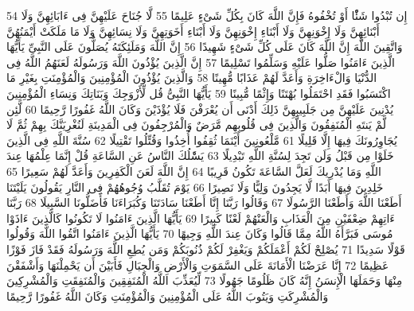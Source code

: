 \documentclass[20pt,a4paper]{article}
\begin{document}
{\tiny\colorbox{cl_aya}{54}} إِن تُبْدُوا شَئًْا أَوْ تُخْفُوهُ فَإِنَّ اللَّهَ كَانَ بِكُلِّ شَىْءٍ عَلِيمًا
{\tiny\colorbox{cl_aya}{55}} لَّا جُنَاحَ عَلَيْهِنَّ فِى ءَابَائِهِنَّ وَلَا أَبْنَائِهِنَّ وَلَا إِخْوَنِهِنَّ وَلَا أَبْنَاءِ إِخْوَنِهِنَّ وَلَا أَبْنَاءِ أَخَوَتِهِنَّ وَلَا نِسَائِهِنَّ وَلَا مَا مَلَكَتْ أَيْمَنُهُنَّ وَاتَّقِينَ اللَّهَ إِنَّ اللَّهَ كَانَ عَلَى كُلِّ شَىْءٍ شَهِيدًا
{\tiny\colorbox{cl_aya}{56}} إِنَّ اللَّهَ وَمَلَئِكَتَهُ يُصَلُّونَ عَلَى النَّبِىِّ يَأَيُّهَا الَّذِينَ ءَامَنُوا صَلُّوا عَلَيْهِ وَسَلِّمُوا تَسْلِيمًا
{\tiny\colorbox{cl_aya}{57}} إِنَّ الَّذِينَ يُؤْذُونَ اللَّهَ وَرَسُولَهُ لَعَنَهُمُ اللَّهُ فِى الدُّنْيَا وَالْءَاخِرَةِ وَأَعَدَّ لَهُمْ عَذَابًا مُّهِينًا
{\tiny\colorbox{cl_aya}{58}} وَالَّذِينَ يُؤْذُونَ الْمُؤْمِنِينَ وَالْمُؤْمِنَتِ بِغَيْرِ مَا اكْتَسَبُوا فَقَدِ احْتَمَلُوا بُهْتَنًا وَإِثْمًا مُّبِينًا
{\tiny\colorbox{cl_aya}{59}} يَأَيُّهَا النَّبِىُّ قُل لِّأَزْوَجِكَ وَبَنَاتِكَ وَنِسَاءِ الْمُؤْمِنِينَ يُدْنِينَ عَلَيْهِنَّ مِن جَلَبِيبِهِنَّ ذَلِكَ أَدْنَى أَن يُعْرَفْنَ فَلَا يُؤْذَيْنَ وَكَانَ اللَّهُ غَفُورًا رَّحِيمًا
{\tiny\colorbox{cl_aya}{60}} لَّئِن لَّمْ يَنتَهِ الْمُنَفِقُونَ وَالَّذِينَ فِى قُلُوبِهِم مَّرَضٌ وَالْمُرْجِفُونَ فِى الْمَدِينَةِ لَنُغْرِيَنَّكَ بِهِمْ ثُمَّ لَا يُجَاوِرُونَكَ فِيهَا إِلَّا قَلِيلًا
{\tiny\colorbox{cl_aya}{61}} مَّلْعُونِينَ أَيْنَمَا ثُقِفُوا أُخِذُوا وَقُتِّلُوا تَقْتِيلًا
{\tiny\colorbox{cl_aya}{62}} سُنَّةَ اللَّهِ فِى الَّذِينَ خَلَوْا مِن قَبْلُ وَلَن تَجِدَ لِسُنَّةِ اللَّهِ تَبْدِيلًا
{\tiny\colorbox{cl_aya}{63}} يَسَْٔلُكَ النَّاسُ عَنِ السَّاعَةِ قُلْ إِنَّمَا عِلْمُهَا عِندَ اللَّهِ وَمَا يُدْرِيكَ لَعَلَّ السَّاعَةَ تَكُونُ قَرِيبًا
{\tiny\colorbox{cl_aya}{64}} إِنَّ اللَّهَ لَعَنَ الْكَفِرِينَ وَأَعَدَّ لَهُمْ سَعِيرًا
{\tiny\colorbox{cl_aya}{65}} خَلِدِينَ فِيهَا أَبَدًا لَّا يَجِدُونَ وَلِيًّا وَلَا نَصِيرًا
{\tiny\colorbox{cl_aya}{66}} يَوْمَ تُقَلَّبُ وُجُوهُهُمْ فِى النَّارِ يَقُولُونَ يَلَيْتَنَا أَطَعْنَا اللَّهَ وَأَطَعْنَا الرَّسُولَا
{\tiny\colorbox{cl_aya}{67}} وَقَالُوا رَبَّنَا إِنَّا أَطَعْنَا سَادَتَنَا وَكُبَرَاءَنَا فَأَضَلُّونَا السَّبِيلَا
{\tiny\colorbox{cl_aya}{68}} رَبَّنَا ءَاتِهِمْ ضِعْفَيْنِ مِنَ الْعَذَابِ وَالْعَنْهُمْ لَعْنًا كَبِيرًا
{\tiny\colorbox{cl_aya}{69}} يَأَيُّهَا الَّذِينَ ءَامَنُوا لَا تَكُونُوا كَالَّذِينَ ءَاذَوْا مُوسَى فَبَرَّأَهُ اللَّهُ مِمَّا قَالُوا وَكَانَ عِندَ اللَّهِ وَجِيهًا
{\tiny\colorbox{cl_aya}{70}} يَأَيُّهَا الَّذِينَ ءَامَنُوا اتَّقُوا اللَّهَ وَقُولُوا قَوْلًا سَدِيدًا
{\tiny\colorbox{cl_aya}{71}} يُصْلِحْ لَكُمْ أَعْمَلَكُمْ وَيَغْفِرْ لَكُمْ ذُنُوبَكُمْ وَمَن يُطِعِ اللَّهَ وَرَسُولَهُ فَقَدْ فَازَ فَوْزًا عَظِيمًا
{\tiny\colorbox{cl_aya}{72}} إِنَّا عَرَضْنَا الْأَمَانَةَ عَلَى السَّمَوَتِ وَالْأَرْضِ وَالْجِبَالِ فَأَبَيْنَ أَن يَحْمِلْنَهَا وَأَشْفَقْنَ مِنْهَا وَحَمَلَهَا الْإِنسَنُ إِنَّهُ كَانَ ظَلُومًا جَهُولًا
{\tiny\colorbox{cl_aya}{73}} لِّيُعَذِّبَ اللَّهُ الْمُنَفِقِينَ وَالْمُنَفِقَتِ وَالْمُشْرِكِينَ وَالْمُشْرِكَتِ وَيَتُوبَ اللَّهُ عَلَى الْمُؤْمِنِينَ وَالْمُؤْمِنَتِ وَكَانَ اللَّهُ غَفُورًا رَّحِيمًا
\end{document}
